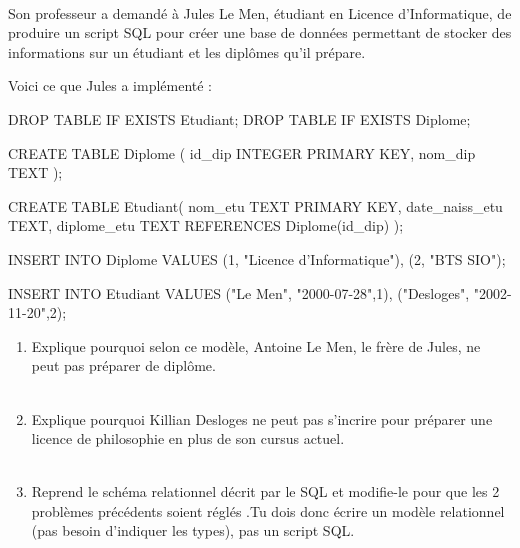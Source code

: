 \documentclass[a4paper,12pt]{article}
\begin{document}
\exo{}\\

Son professeur a demandé à Jules Le Men, étudiant en Licence d'Informatique, de produire un script SQL pour créer une base de données permettant de
stocker des informations sur un étudiant et les diplômes qu'il prépare.

Voici ce que Jules a implémenté :

\begin{sql}
DROP TABLE IF EXISTS Etudiant;
DROP TABLE IF EXISTS Diplome;

CREATE TABLE Diplome
(
    id_dip INTEGER PRIMARY KEY,
    nom_dip TEXT
);

CREATE TABLE Etudiant(
    nom_etu TEXT PRIMARY KEY,
    date_naiss_etu TEXT,
    diplome_etu TEXT REFERENCES Diplome(id_dip)
);

INSERT INTO Diplome VALUES
    (1, "Licence d'Informatique"),
    (2, "BTS SIO");

INSERT INTO Etudiant VALUES
    ("Le Men", "2000-07-28",1),
    ("Desloges", "2002-11-20",2);
\end{sql}


\begin{enumerate}[\bfseries 1.]
	\item 	Explique pourquoi selon ce modèle, Antoine Le Men, le frère de Jules, ne peut pas préparer de diplôme.\\

                \\

	\item 	Explique pourquoi Killian Desloges ne peut pas s'incrire pour préparer une licence de philosophie en plus de son cursus actuel.\\

                    \\

    \item   Reprend le schéma relationnel décrit par le SQL et modifie-le pour que les 2 problèmes précédents soient réglés .Tu dois donc écrire un modèle relationnel (pas besoin d'indiquer les types), pas un script SQL.\\


 \newpage
{}
\end{enumerate}
\end{document}
